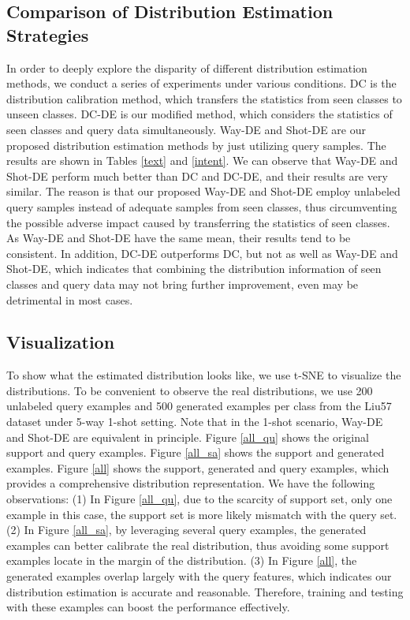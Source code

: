 \documentclass[letterpaper]{article} %
\begin{document}
\subsection{Comparison of Distribution Estimation Strategies}
In order to deeply explore the disparity of different distribution estimation methods, we conduct a series of experiments under various conditions. DC \cite{freelunch} is the distribution calibration method, which transfers the statistics from seen classes to unseen classes. DC-DE is our modified method, which considers the statistics of seen classes and query data simultaneously. Way-DE and Shot-DE are our proposed distribution estimation methods by just utilizing query samples. The results are shown in Tables \ref{text} and \ref{intent}. We can observe that Way-DE and Shot-DE perform much better than DC and DC-DE, and their results are very similar. The reason is that our proposed Way-DE and Shot-DE employ unlabeled query samples instead of adequate samples from seen
classes, thus circumventing the possible adverse impact caused by transferring the statistics of seen classes. As Way-DE and Shot-DE have the same mean, their results tend to be consistent. In addition, DC-DE outperforms DC, but not as well as Way-DE and Shot-DE, which indicates that combining the distribution information of seen classes and query data may not bring further improvement, even may be detrimental in most cases.

\subsection{Visualization}
To show what the estimated distribution looks like, we use t-SNE \cite{van2008visualizing} to visualize the distributions. To be convenient to observe the real distributions, we use 200 unlabeled query examples and 500 generated examples per class from the Liu57 dataset under 5-way 1-shot setting. Note that in the 1-shot scenario, Way-DE and Shot-DE are equivalent in principle. Figure \ref{all_qu} shows the original support and query examples. Figure \ref{all_sa} shows the support and generated examples. Figure \ref{all} shows the support, generated and query examples, which provides a comprehensive distribution representation. We have the following observations: (1) In Figure \ref{all_qu}, due to the scarcity of support set, only one example in this case, the support set is more likely mismatch with the query set. (2) In Figure \ref{all_sa}, by leveraging several query examples, the generated examples can better calibrate the real distribution, thus avoiding some support examples locate in the margin of the distribution. (3) In Figure \ref{all}, the generated examples overlap largely with the query features, which indicates our distribution estimation is accurate and reasonable. Therefore, training and testing with these examples can boost the performance effectively.
\end{document}
